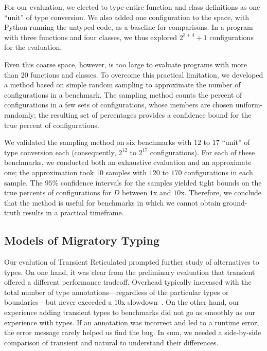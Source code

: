 For our evaluation, we elected to type entire function and class definitions
 as one ``unit'' of type conversion.
We also added one configuration to the space, with Python running the untyped
 code, as a baseline for comparisons.
In a program with three functions and four classes, we thus explored
 $2^{3+4} + 1$ configurations for the evaluation.

Even this coarse space, however, is too large to evaluate programs with more
 than $20$ functions and classes.
To overcome this practical limitation, we developed a method based on
 simple random sampling to approximate the number of 
 configurations in a benchmark.
The sampling method counts the percent of  configurations
 in a few sets of configurations, whose members are chosen uniform-randomly;
 the resulting set of percentages provides a confidence bound for the true
 percent of  configurations.

We validated the sampling method on six benchmarks with $12$ to $17$ ``unit''
 of type conversion each (consequently, $2^{12}$ to $2^{17}$ configurations).
For each of these benchmarks, we conducted both an exhaustive evaluation and
 an approximate one; the approximation took $10$ samples with $120$ to $170$
 configurations in each sample.
The $95$\% confidence intervals for the samples yielded tight bounds on the
 true percents of  configurations for $D$ between $1$x and
 $10$x.
Therefore, we conclude that the method is useful for benchmarks in which we
 cannot obtain ground-truth results in a practical timeframe.


\subsection{Models of Migratory Typing}

Our evalution of Transient Reticulated prompted further study of alternatives
 to \tdeep{} types.
On one hand, it was clear from the preliminary evaluation that transient offered
 a different performance tradeoff.
Overhead typically increased with the total number of type annotations---regardless
 of the particular types or boundaries---but never exceeded a $10$x
 slowdown~\cite{gm-pepm-2018}.
On the other hand, our experience adding transient types to benchmarks
 did not go as smoothly as our experience with \tdeep{} types.
If an annotation was incorrect and led to a runtime error, the error message
 rarely helped us find the bug.
In sum, we needed a side-by-side comparison of transient and natural to
 understand their differences.

